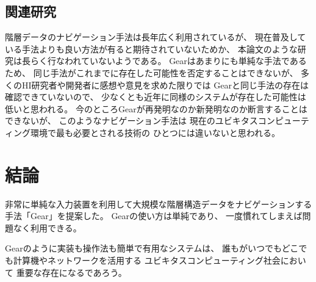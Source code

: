 \documentclass[twoside]{wiss}
\def\GEAR{\textsf{Gear}}
\begin{document}

\subsection{関連研究}

階層データのナビゲーション手法は長年広く利用されているが、
現在普及している手法よりも良い方法が有ると期待されていないためか、
本論文のような研究は長らく行なわれていないようである。
%
{\GEAR}はあまりにも単純な手法であるため、
同じ手法がこれまでに存在した可能性を否定することはできないが、
多くのHI研究者や開発者に感想や意見を求めた限りでは
{\GEAR}と同じ手法の存在は確認できていないので、
少なくとも近年に同様のシステムが存在した可能性は低いと思われる。
%
今のところ{\GEAR}が再発明なのか新発明なのか断言することはできないが、
このようなナビゲーション手法は
現在のユビキタスコンピューティング環境で最も必要とされる技術の
ひとつには違いないと思われる。

\section{結論}

非常に単純な入力装置を利用して大規模な階層構造データをナビゲーションする
手法「{\GEAR}」を提案した。
{\GEAR}の使い方は単純であり、
一度慣れてしまえば問題なく利用できる。

{\GEAR}のように実装も操作法も簡単で有用なシステムは、
誰もがいつでもどこでも計算機やネットワークを活用する
ユビキタスコンピューティング社会において
重要な存在になるであろう。

{\scriptsize


}
\end{document}
